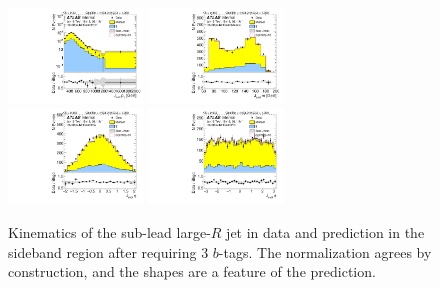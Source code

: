 \begin{figure}[htbp!]
\begin{center}
\includegraphics[width=0.32\textwidth,angle=-90]{figures/boosted/Sideband/b77_ThreeTag_Sideband_sublHCand_Pt_m_1.pdf}
\includegraphics[width=0.32\textwidth,angle=-90]{figures/boosted/Sideband/b77_ThreeTag_Sideband_sublHCand_Mass_s.pdf}\\
\includegraphics[width=0.32\textwidth,angle=-90]{figures/boosted/Sideband/b77_ThreeTag_Sideband_sublHCand_Eta.pdf}
\includegraphics[width=0.32\textwidth,angle=-90]{figures/boosted/Sideband/b77_ThreeTag_Sideband_sublHCand_Phi.pdf}
  \caption{Kinematics of the sub-lead large-$R$ jet in data and prediction in the sideband region after requiring 3 $b$-tags. The normalization agrees by construction, and the shapes are a feature of the prediction.}
  \label{fig:boosted-3b-sideband-ak10-subl}
\end{center}
\end{figure}


